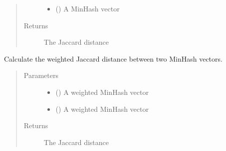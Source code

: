 \documentclass[letterpaper,10pt,english]{sphinxmanual}
\begin{document}
\begin{fulllineitems}
\begin{fulllineitems}
\begin{quote}
\begin{description}
\begin{itemize}
\item {} 
 () \textendash{} A MinHash vector

\end{itemize}

\item[{Returns}] \leavevmode
{} The Jaccard distance

\end{description}\end{quote}

\end{fulllineitems}


\begin{fulllineitems}
\label{\detokenize{documentation:tmap.Minhash.get_weighted_distance}}
Calculate the weighted Jaccard distance between two MinHash vectors.
\begin{quote}\begin{description}
\item[{Parameters}] \leavevmode\begin{itemize}
\item {} 
 () \textendash{} A weighted MinHash vector

\item {} 
 () \textendash{} A weighted MinHash vector

\end{itemize}

\item[{Returns}] \leavevmode
{} The Jaccard distance

\end{description}\end{quote}

\end{fulllineitems}


\end{fulllineitems}
\end{document}
